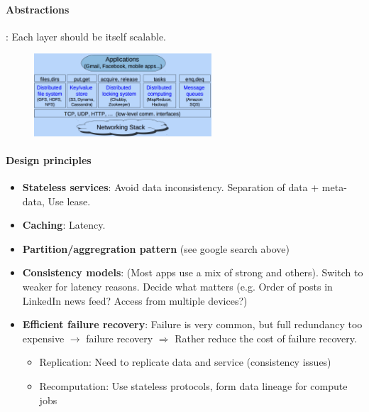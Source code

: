 \paragraph{Abstractions}: Each layer should be itself scalable.
\begin{figure}[h]
  \centering
    \includegraphics[width=0.59\textwidth]{img/abstraction.png}
\end{figure}

\paragraph{Design principles}
\begin{itemize}
\item \textbf{Stateless services}: Avoid data inconsistency. Separation of data +
  meta-data, Use lease.
\item \textbf{Caching}: Latency.
\item \textbf{Partition/aggregration pattern} (see google search above)
\item \textbf{Consistency models}: (Most apps use a mix of strong and others).
  Switch to weaker for latency reasons. Decide what matters (e.g. Order of posts
  in LinkedIn news feed? Access from multiple devices?)
\item \textbf{Efficient failure recovery}: Failure is very common, but full redundancy
  too expensive $\rightarrow$ failure recovery $\Rightarrow$ Rather reduce the cost of failure recovery.
  \begin{itemize}
    \item Replication: Need to replicate data and service (consistency issues)
      \item Recomputation: Use stateless protocols, form data lineage for compute jobs
  \end{itemize}
\end{itemize}
